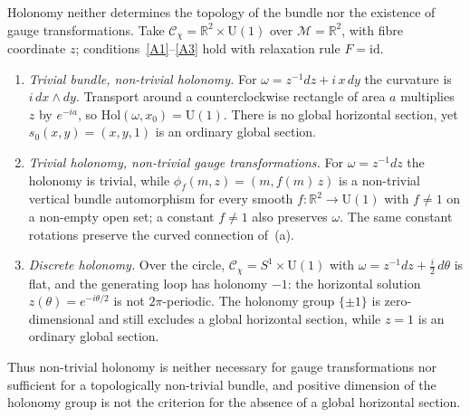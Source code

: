     \begin{remark}
      Holonomy neither determines the topology of the bundle nor the existence of gauge transformations.
      Take $\mathcal{C}_\chi = \mathbb{R}^2 \times \mathrm{U}(1)$ over $\mathcal{M} = \mathbb{R}^2$, with fibre
      coordinate $z$; conditions~\ref{A1}--\ref{A3} hold with relaxation rule $F = \mathrm{id}$.
      \begin{enumerate}[label=(\alph*)]
        \item \emph{Trivial bundle, non-trivial holonomy.}
        For $\omega = z^{-1} dz + i\,x\,dy$ the curvature is $i\,dx \wedge dy$.
        Transport around a counterclockwise rectangle of area $a$ multiplies $z$ by $e^{-ia}$, so
        $\mathrm{Hol}(\omega, x_0) = \mathrm{U}(1)$.
        There is no global horizontal section, yet $s_0(x,y) = (x,y,1)$ is an ordinary global section.
        \item \emph{Trivial holonomy, non-trivial gauge transformations.}
        For $\omega = z^{-1} dz$ the holonomy is trivial, while $\phi_f(m, z) = (m, f(m)\, z)$ is a non-trivial
        vertical bundle automorphism for every smooth $f : \mathbb{R}^2 \to \mathrm{U}(1)$ with $f \neq 1$ on a
        non-empty open set; a constant $f \neq 1$ also preserves $\omega$.
        The same constant rotations preserve the curved connection of~(a).
        \item \emph{Discrete holonomy.}
        Over the circle, $\mathcal{C}_\chi = S^1 \times \mathrm{U}(1)$ with $\omega = z^{-1} dz + \tfrac{i}{2}\,d\theta$
        is flat, and the generating loop has holonomy $-1$: the horizontal solution $z(\theta) = e^{-i\theta/2}$ is
        not $2\pi$-periodic.
        The holonomy group $\{\pm 1\}$ is zero-dimensional and still excludes a global horizontal section, while
        $z = 1$ is an ordinary global section.
      \end{enumerate}
      Thus non-trivial holonomy is neither necessary for gauge transformations nor sufficient for a topologically
      non-trivial bundle, and positive dimension of the holonomy group is not the criterion for the absence of a
      global horizontal section.
    \end{remark}

